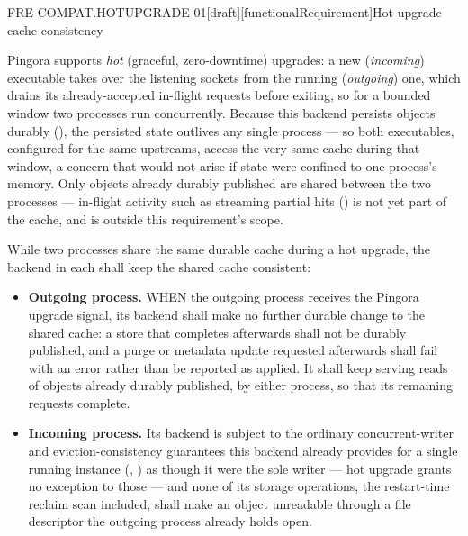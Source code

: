 \begin{requirement}{FRE-COMPAT.HOTUPGRADE-01}[draft][functionalRequirement]{Hot-upgrade cache consistency}


  Pingora supports \emph{hot} (graceful, zero-downtime) upgrades: a new
  (\emph{incoming}) executable takes over the listening sockets from the
  running (\emph{outgoing}) one, which drains its already-accepted
  in-flight requests before exiting, so for a bounded window two processes
  run concurrently. Because this backend persists objects durably
  (), the persisted state outlives any
  single process --- so both executables, configured for the same
  upstreams, access the very same cache during that window, a concern that
  would not arise if state were confined to one process's memory. Only
  objects already durably published are shared between the two processes
  --- in-flight activity such as streaming partial hits
  () is not yet part of the cache, and is
  outside this requirement's scope.

  While two processes share the same durable cache during a hot upgrade,
  the backend in each shall keep the shared cache consistent:
  \begin{itemize}
    \item \textbf{Outgoing process.} WHEN the outgoing process receives
      the Pingora upgrade signal, its backend shall make no further durable
      change to the shared cache: a store that completes afterwards shall
      not be durably published, and a purge or metadata update requested
      afterwards shall fail with an error rather than be reported as
      applied. It shall keep serving reads of objects already durably
      published, by either process, so that its remaining requests
      complete.
    \item \textbf{Incoming process.} Its backend is subject to the ordinary
      concurrent-writer and eviction-consistency guarantees this backend
      already provides for a single running instance
      (, )
      as though it were the sole writer --- hot upgrade grants no exception
      to those --- and none of its storage operations, the restart-time
      reclaim scan included, shall make an object unreadable through a file
      descriptor the outgoing process already holds open.
  \end{itemize}


\end{requirement}
